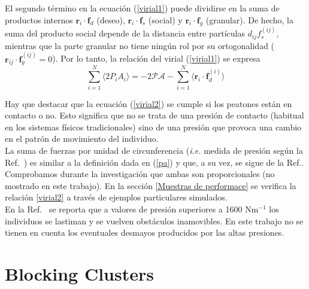 El segundo término en la ecuación (\ref{virial1}) puede dividirse en la suma de productos internos $\mathbf{r}_i\cdot\mathbf{f}_d$ (deseo), 
$\mathbf{r}_i\cdot\mathbf{f}_s$ (social) y $\mathbf{r}_i\cdot\mathbf{f}_g$ (granular). De hecho, la suma del producto social depende de la distancia entre partículas $d_{ij}f_s^{(ij)}$, mientras que la parte granular no tiene ningún rol por su ortogonalidad ($\mathbf{r}_{ij}\cdot\mathbf{f}_g^{(ij)}=0$). Por lo tanto, la relación del virial (\ref{virial1}) se expresa \\  

\begin{equation}
 \displaystyle\sum_{i=1}^N\langle2P_iA_i 
\rangle=-2\mathcal{PA} -\displaystyle\sum_{i=1}^N \langle
\mathbf{r}_i\cdot\mathbf{f}_d^{(i)}\rangle\label{virial2}
\end{equation}

Hay que destacar que la ecuación (\ref{virial2}) se cumple si los peatones están en contacto o no. Esto significa que no se trata de una presión de contacto (habitual en los sistemas físicos tradicionales) sino de una presión que provoca una cambio en el patrón de movimiento del individuo.\\

La suma de fuerzas por unidad de circunferencia (\textit{i.e.} medida de presión según la Ref.~\cite{Helbing1}) es similar a la definición dada en (\ref{pa}) y que, a su vez, se sigue de la Ref.\cite{lion}. Comprobamos durante la investigación que ambas son proporcionales (no mostrado en este trabajo). En la sección \ref{Muestras de performace} se verifica la relación \eqref{virial2} a través de ejemplos particulares simulados.\\   

En la Ref.~\cite{Helbing1} se reporta que a valores de presión superiores a 1600 Nm$^{-1}$ los individuos se lastiman y se vuelven obstáculos inamovibles. En este trabajo no se tienen en cuenta los eventuales desmayos producidos por las altas presiones. 

\section{Blocking Clusters}

